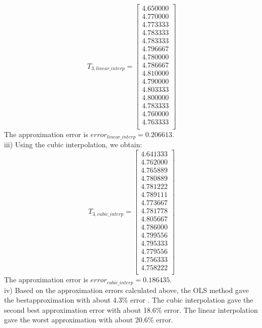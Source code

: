 \documentclass{article}
\begin{document}
\begin{equation*}
T_{3,linear\_interp} = %
\begin{bmatrix}{}
  4.650000 \\ 
  4.770000 \\ 
  4.773333 \\ 
  4.783333 \\ 
  4.783333 \\ 
  4.796667 \\ 
  4.780000 \\ 
  4.786667 \\ 
  4.810000 \\ 
  4.790000 \\ 
  4.803333 \\ 
  4.800000 \\ 
  4.783333 \\ 
  4.760000 \\ 
  4.763333 \\ 
  \end{bmatrix}
\end{equation*}
The approximation error is $error_{linear\_interp} = 0.206613$.
\vspace{5mm} \\
iii) Using the cubic interpolation, we obtain:
\begin{equation*}
T_{3,cubic\_interp} = \begin{bmatrix}{}
  4.641333 \\ 
  4.762000 \\ 
  4.765889 \\ 
  4.780889 \\ 
  4.781222 \\ 
  4.789111 \\ 
  4.773667 \\ 
  4.781778 \\ 
  4.805667 \\ 
  4.786000 \\ 
  4.799556 \\ 
  4.795333 \\ 
  4.779556 \\ 
  4.756333 \\ 
  4.758222 \\ 
  \end{bmatrix}
\end{equation*}
The approximation error is $error_{cubic\_interp} = 0.186435$.
\vspace{5mm} \\
iv) Based on the approximation errors calculated above, the OLS method gave the bestapproximation with about 4.3\% error . The cubic interpolation gave the second best approximation error with about 18.6\% error. The linear interpolation gave the worst approximation with about 20.6\% error.
\end{document}
